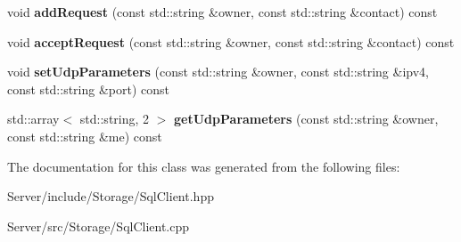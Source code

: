 \begin{DoxyCompactItemize}
void {\bfseries add\+Request} (const std\+::string \&owner, const std\+::string \&contact) const
\item 
\mbox{\label{classbbl_1_1srv_1_1_sql_client_abab7af1c3fe96c98c8c4d5b1c3a1389c}} 
void {\bfseries accept\+Request} (const std\+::string \&owner, const std\+::string \&contact) const
\item 
\mbox{\label{classbbl_1_1srv_1_1_sql_client_adbf1c95f96b24d2cc25d29672d53611d}} 
void {\bfseries set\+Udp\+Parameters} (const std\+::string \&owner, const std\+::string \&ipv4, const std\+::string \&port) const
\item 
\mbox{\label{classbbl_1_1srv_1_1_sql_client_a8055ff59a2b1b019f1d301849bfe11c9}} 
std\+::array$<$ std\+::string, 2 $>$ {\bfseries get\+Udp\+Parameters} (const std\+::string \&owner, const std\+::string \&me) const
\end{DoxyCompactItemize}


The documentation for this class was generated from the following files\+:\begin{DoxyCompactItemize}
\item 
Server/include/\+Storage/Sql\+Client.\+hpp\item 
Server/src/\+Storage/Sql\+Client.\+cpp\end{DoxyCompactItemize}
